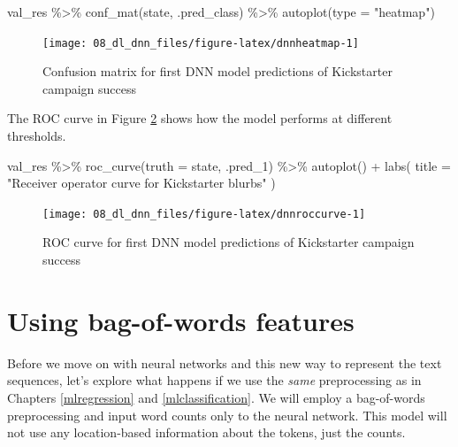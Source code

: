\documentclass[
]{krantz}
\makeatletter
\newenvironment{Shaded}{\begin{snugshade}}{\end{snugshade}}
\newcommand{\AttributeTok}[1]{\textcolor[rgb]{0.77,0.63,0.00}{#1}}
\newcommand{\FunctionTok}[1]{\textcolor[rgb]{0.00,0.00,0.00}{#1}}
\newcommand{\NormalTok}[1]{#1}
\newcommand{\SpecialCharTok}[1]{\textcolor[rgb]{0.00,0.00,0.00}{#1}}
\newcommand{\StringTok}[1]{\textcolor[rgb]{0.31,0.60,0.02}{#1}}
\newenvironment{kframe}{%
\medskip{}
\setlength{\fboxsep}{.8em}
 \def\at@end@of@kframe{}%
 \ifinner\ifhmode%
  \def\at@end@of@kframe{\end{minipage}}%
  \begin{minipage}{\columnwidth}%
 \fi\fi%
 \def\FrameCommand##1{\hskip\@totalleftmargin \hskip-\fboxsep
 \colorbox{shadecolor}{##1}\hskip-\fboxsep
     \hskip-\linewidth \hskip-\@totalleftmargin \hskip\columnwidth}%
 \MakeFramed {\advance\hsize-\width
   \@totalleftmargin\z@ \linewidth\hsize
   \@setminipage}}%
 {\par\unskip\endMakeFramed%
 \at@end@of@kframe}
\renewenvironment{Shaded}{\begin{kframe}}{\end{kframe}}
\makeatother
\begin{document}
\begin{Shaded}
\begin{Highlighting}[]
\NormalTok{val\_res }\SpecialCharTok{\%\textgreater{}\%}
  \FunctionTok{conf\_mat}\NormalTok{(state, .pred\_class) }\SpecialCharTok{\%\textgreater{}\%}
  \FunctionTok{autoplot}\NormalTok{(}\AttributeTok{type =} \StringTok{"heatmap"}\NormalTok{)}
\end{Highlighting}
\end{Shaded}

\begin{figure}

{\centering \texttt{[image: 08\_dl\_dnn\_files/figure-latex/dnnheatmap-1]} 

}

\caption{Confusion matrix for first DNN model predictions of Kickstarter campaign success}\label{fig:dnnheatmap}
\end{figure}

The ROC curve in Figure \ref{fig:dnnroccurve} shows how the model performs at different thresholds.

\begin{Shaded}
\begin{Highlighting}[]
\NormalTok{val\_res }\SpecialCharTok{\%\textgreater{}\%}
  \FunctionTok{roc\_curve}\NormalTok{(}\AttributeTok{truth =}\NormalTok{ state, .pred\_1) }\SpecialCharTok{\%\textgreater{}\%}
  \FunctionTok{autoplot}\NormalTok{() }\SpecialCharTok{+}
  \FunctionTok{labs}\NormalTok{(}
    \AttributeTok{title =} \StringTok{"Receiver operator curve for Kickstarter blurbs"}
\NormalTok{  )}
\end{Highlighting}
\end{Shaded}

\begin{figure}

{\centering \texttt{[image: 08\_dl\_dnn\_files/figure-latex/dnnroccurve-1]} 

}

\caption{ROC curve for first DNN model predictions of Kickstarter campaign success}\label{fig:dnnroccurve}
\end{figure}

\hypertarget{using-bag-of-words-features}{%
\section{Using bag-of-words features}\label{using-bag-of-words-features}}

Before we move on with neural networks and this new way to represent the text sequences, let's explore what happens if we use the \emph{same} preprocessing as in Chapters \ref{mlregression} and \ref{mlclassification}. We will employ a bag-of-words preprocessing and input word counts only to the neural network. This model will not use any location-based information about the tokens, just the counts.
\end{document}
